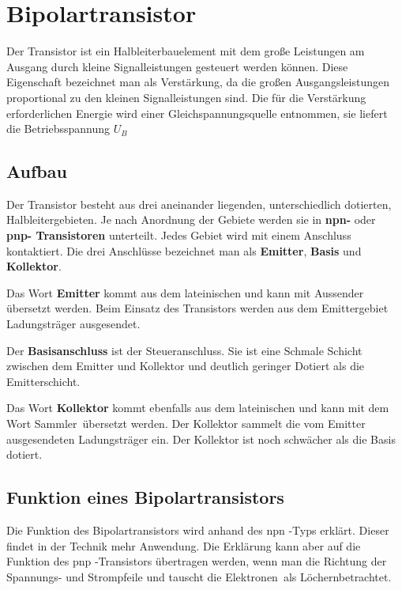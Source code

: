 \chapter{Bipolartransistor}

Der Transistor ist ein Halbleiterbauelement mit dem große Leistungen am Ausgang durch kleine Signalleistungen gesteuert werden können. Diese Eigenschaft bezeichnet man als Verstärkung, da die großen Ausgangsleistungen proportional zu den kleinen Signalleistungen sind. Die für die Verstärkung erforderlichen Energie  wird einer Gleichspannungsquelle entnommen, sie liefert die Betriebsspannung $U_B$


\section{Aufbau}

Der Transistor besteht  aus drei aneinander liegenden, unterschiedlich dotierten, Halbleitergebieten. Je nach Anordnung der Gebiete werden sie in \textbf{npn-} oder \textbf{pnp- Transistoren} unterteilt.  Jedes Gebiet wird mit einem Anschluss kontaktiert. Die drei Anschlüsse bezeichnet man als \textbf{Emitter}, \textbf{Basis} und \textbf{Kollektor}.

Das Wort \textbf{Emitter} kommt aus dem lateinischen und kann mit \glqq Aussender\grqq \,  übersetzt werden. Beim Einsatz des Transistors werden aus dem Emittergebiet Ladungsträger ausgesendet. 

Der \textbf{Basisanschluss} ist der Steueranschluss. Sie ist eine Schmale Schicht zwischen dem Emitter und Kollektor und deutlich geringer Dotiert als die Emitterschicht. 

Das Wort \textbf{Kollektor} kommt ebenfalls aus dem lateinischen und kann mit dem Wort \glqq Sammler\grqq \, übersetzt werden. Der Kollektor sammelt die vom Emitter ausgesendeten Ladungsträger ein. Der Kollektor ist noch schwächer als die Basis dotiert. 

\section{Funktion eines Bipolartransistors}

Die Funktion des Bipolartransistors wird anhand des npn -Typs erklärt. Dieser findet in der Technik mehr Anwendung. Die Erklärung kann aber auf die Funktion des pnp -Transistors übertragen werden, wenn man die Richtung der Spannungs- und Strompfeile und tauscht die \glqq Elektronen\grqq \,  als \glqq Löchern\grqq betrachtet.  

